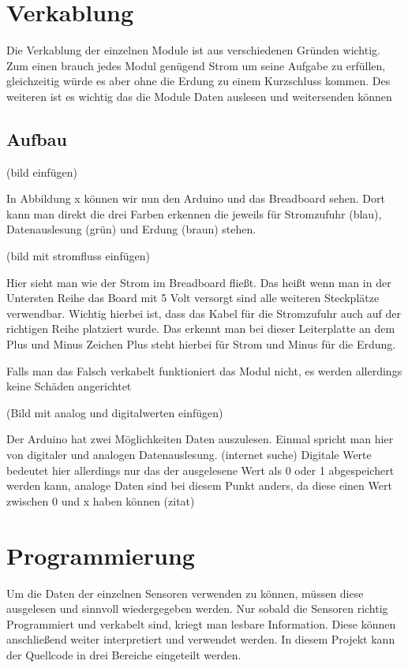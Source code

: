 \def \currentAuthor {Kevin Glatz}
\newpage


\section{Verkablung}

Die Verkablung der einzelnen Module ist aus verschiedenen Gründen wichtig. Zum einen brauch jedes Modul genügend Strom um seine Aufgabe zu erfüllen, gleichzeitig würde es aber ohne die Erdung zu einem Kurzschluss kommen. Des weiteren ist es wichtig das die Module Daten auslesen und weitersenden können

\subsection{Aufbau}

(bild einfügen)

In Abbildung x können wir nun den Arduino und das Breadboard sehen.  Dort kann man direkt die drei Farben erkennen die jeweils für Stromzufuhr (blau), Datenauslesung (grün) und Erdung (braun) stehen.

(bild mit stromfluss einfügen)

Hier sieht man wie der Strom im Breadboard fließt. Das heißt wenn man in der Untersten Reihe das Board mit 5 Volt versorgt sind alle weiteren Steckplätze verwendbar. Wichtig hierbei ist, dass das Kabel für die Stromzufuhr auch auf der richtigen Reihe platziert wurde. Das erkennt man bei dieser Leiterplatte an dem Plus und Minus Zeichen Plus steht hierbei für Strom und Minus für die Erdung.

Falls man das Falsch verkabelt funktioniert das Modul nicht, es werden allerdings keine Schäden angerichtet


(Bild mit analog und digitalwerten einfügen)

Der Arduino hat zwei Möglichkeiten Daten auszulesen. Einmal spricht man hier von digitaler und analogen Datenauslesung. (internet suche) Digitale Werte bedeutet hier allerdings nur das der ausgelesene Wert als 0 oder 1 abgespeichert werden kann, analoge Daten sind bei diesem Punkt anders, da diese einen Wert zwischen 0 und x haben können (zitat)

\section{Programmierung}

Um die Daten der einzelnen Sensoren verwenden zu können, müssen diese ausgelesen und sinnvoll wiedergegeben werden. Nur sobald die Sensoren richtig Programmiert und verkabelt sind, kriegt man lesbare Information. Diese können anschließend weiter interpretiert und verwendet werden. 
In diesem Projekt kann der Quellcode in drei Bereiche eingeteilt werden. 



